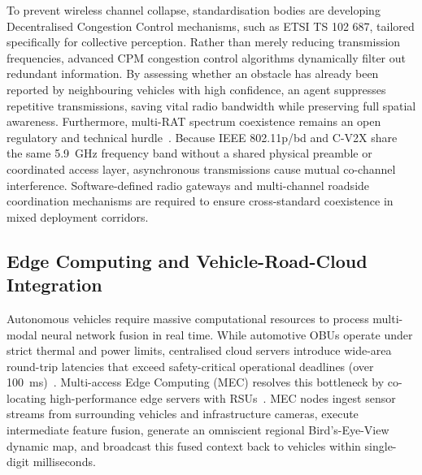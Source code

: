 To prevent wireless channel collapse, standardisation bodies are developing Decentralised Congestion Control mechanisms, such as ETSI TS 102 687, tailored specifically for collective perception.
Rather than merely reducing transmission frequencies, advanced CPM congestion control algorithms dynamically filter out redundant information.
By assessing whether an obstacle has already been reported by neighbouring vehicles with high confidence, an agent suppresses repetitive transmissions, saving vital radio bandwidth while preserving full spatial awareness.
Furthermore, multi-RAT spectrum coexistence remains an open regulatory and technical hurdle~\cite{hejazi2022survey}.
Because IEEE 802.11p/bd and C-V2X share the same 5.9~GHz frequency band without a shared physical preamble or coordinated access layer, asynchronous transmissions cause mutual co-channel interference.
Software-defined radio gateways and multi-channel roadside coordination mechanisms are required to ensure cross-standard coexistence in mixed deployment corridors.

\subsection{Edge Computing and Vehicle-Road-Cloud Integration}
\label{subsec:edge_computing}

Autonomous vehicles require massive computational resources to process multi-modal neural network fusion in real time.
While automotive OBUs operate under strict thermal and power limits, centralised cloud servers introduce wide-area round-trip latencies that exceed safety-critical operational deadlines (over 100~ms)~\cite{huang2025v2x}.
Multi-access Edge Computing (MEC) resolves this bottleneck by co-locating high-performance edge servers with RSUs~\cite{huang2025v2x}.
MEC nodes ingest sensor streams from surrounding vehicles and infrastructure cameras, execute intermediate feature fusion, generate an omniscient regional Bird's-Eye-View dynamic map, and broadcast this fused context back to vehicles within single-digit milliseconds.

